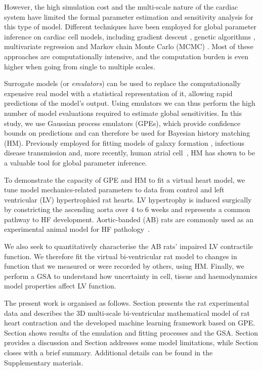 However, the high simulation cost and the multi-scale nature of the cardiac system have limited the formal parameter estimation and sensitivity analysis for this type of model. Different techniques have been employed for global parameter inference on cardiac cell models, including gradient descent \cite{Dokos:2004}, genetic algorithms \cite{Groenendaal:2015}, multivariate regression \cite{Sarkar:2010} and Markov chain Monte Carlo (MCMC) \cite{Johnstone:2016}. Most of these approaches are computationally intensive, and the computation burden is even higher when going from single to multiple scales.

Surrogate models (or \textit{emulators}) can be used to replace the computationally expensive real model with a statistical representation of it, allowing rapid predictions of the model's output. Using emulators we can thus perform the high number of model evaluations required to estimate global sensitivities. In this study, we use Gaussian process emulators (GPEs), which provide confidence bounds on predictions and can therefore be used for Bayesian history matching (HM). Previously employed for fitting models of galaxy formation \cite{Vernon:2010}, infectious disease transmission \cite{Andrianakis:2015} and, more recently, human atrial cell~\cite{Coveney:2018}, HM has shown to be a valuable tool for global parameter inference.

To demonstrate the capacity of GPE and HM to fit a virtual heart model, we tune model mechanics-related parameters to data from control and left ventricular (LV) hypertrophied rat hearts. LV hypertrophy is induced surgically by constricting the ascending aorta over $4$ to $6$ weeks and represents a common pathway to HF development. Aortic-banded (AB) rats are commonly used as an experimental animal model for HF pathology~\cite{Camacho:2016}.

We also seek to quantitatively characterise the AB rats' impaired LV contractile function. We therefore fit the virtual bi-ventricular rat model to changes in function that we measured or were recorded by others, using HM. Finally, we perform a GSA to understand how uncertainty in cell, tissue and haemodynamics model properties affect LV function.

The present work is organised as follows. Section presents the rat experimental data and describes the $3$D multi-scale bi-ventricular mathematical model of rat heart contraction and the developed machine learning framework based on GPE. Section shows results of the emulation and fitting processes and the GSA. Section provides a discussion and Section addresses some model limitations, while Section closes with a brief summary. Additional details can be found in the Supplementary materials.

